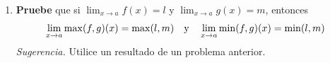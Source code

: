 \documentclass[12pt]{article}
\begin{document}
\begin{enumerate}
    \begin{proof}
        Sea $\varepsilon>0$. Como $\lim_{ x\rightarrow a}f(x)=l$ existe $\delta>0$ tal que
        \begin{equation*}
            \forall x\in S\textup{ tal que }0<\abs{x-a}<\delta\Rightarrow\abs{f(x)-l}<\varepsilon
        \end{equation*}
        pero, recordemos que si $u,v\in\mathbb{R}$:
        \begin{equation*}
            \abs{\abs{u}-\abs{v}}\leq\abs{u-v}
        \end{equation*}
        por tanto,
        \begin{equation*}
            \forall x\in S\textup{ tal que }0<\abs{x-a}<\delta\Rightarrow\abs{\abs{f(x)}-\abs{l}}<\varepsilon
        \end{equation*}
        es decir,
        \begin{equation*}
            \forall x\in S\textup{ tal que }0<\abs{x-a}<\delta\Rightarrow\abs{\abs{f}(x)-\abs{l}}<\varepsilon
        \end{equation*}
        de la definición de límite se sigue entonces que
        \begin{equation*}
            \lim_{ x\rightarrow a}\abs{f}(x)=\abs{l}
        \end{equation*}
    \end{proof}

    \item \textbf{Pruebe} que si $\lim_{ x\rightarrow a}f(x)=l$ y $\lim_{ x\rightarrow a}g(x)=m$, entonces
    \begin{equation*}
        \lim_{ x\rightarrow a}\max(f,g)(x)=\max(l,m)\quad\textup{y}\quad\lim_{ x\rightarrow a}\min(f,g)(x)=\min(l,m)
    \end{equation*}
    \textit{Sugerencia.} Utilice un resultado de un problema anterior.


\end{enumerate}
\end{document}
